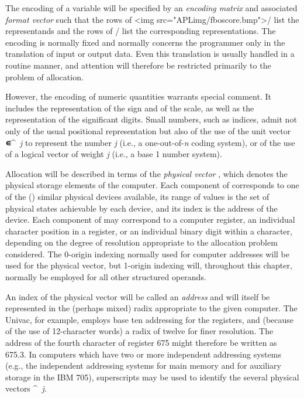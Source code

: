 {\par The encoding of a variable will be specified by an \textit{encoding matrix}  and associated \textit{format vector}  such that the rows of <img src="APLimg/fboscore.bmp">/ list the representands and the rows of / list the corresponding representations. The encoding is normally fixed and normally concerns the programmer only in the translation of input or output data. Even this translation is usually handled in a routine manner, and attention will therefore be restricted primarily to the problem of allocation.

\par However, the encoding of numeric quantities warrants special comment. It includes the representation of the sign and of the scale, as well as the representation of the significant digits. Small numbers, such as indices, admit not only of the usual positional representation but also of the use of the unit vector 
\textbf{∊}^{\textit{\ j}} to represent the number \textit{j} (i.e., a one-out-of-\textit{n} coding system), or of the use of a logical vector of weight \textit{j} (i.e., a base 1 number system).

\par Allocation will be described in terms of the \textit{physical vector} \textbf{\pi}, which denotes the physical storage elements of the computer. Each component of \textbf{\pi} corresponds to one of the \textit{\nu}(\textbf{\pi}) similar physical devices available, its range of values is the set of physical states achievable by each device, and its index is the address of the device. Each component of \textbf{\pi} may correspond to a computer register, an individual character position in a register, or an individual binary digit within a character, depending on the degree of resolution appropriate to the allocation problem considered. The 0-origin indexing normally used for computer addresses will be used for the physical vector, but 1-origin indexing will, throughout this chapter, normally be employed for all other structured operands.

\par An index of the physical vector will be called an \textit{address} and will itself be represented in the (perhaps mixed) radix appropriate to the given computer. The Univac, for example, employs base ten addressing for the registers, and (because of the use of 12-character words) a radix of twelve for finer resolution. The address of the fourth character of register 675 might therefore be written as 675.3. In computers which have two or more independent addressing systems (e.g., the independent addressing systems for main memory and for auxiliary storage in the IBM 705), superscripts may be used to identify the several physical vectors \textbf{\pi}^{\textit{\ j}}.

}
